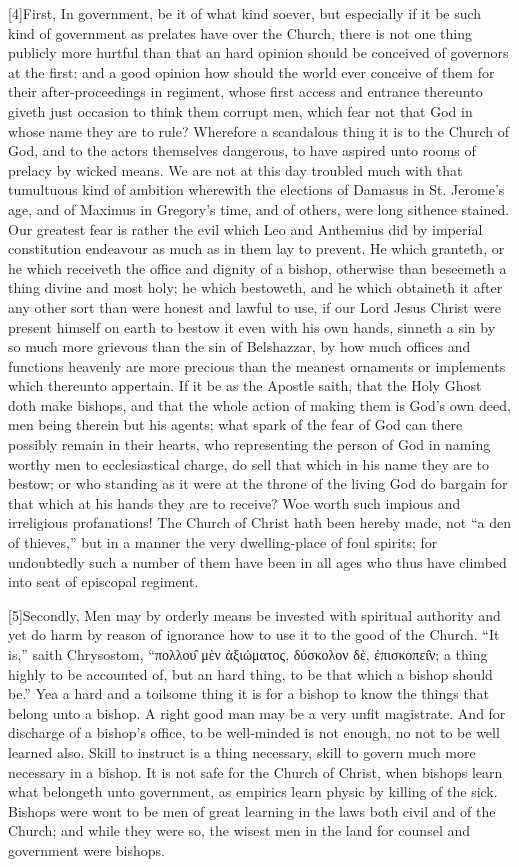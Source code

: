 [4]First, In government, be it of what kind soever, but especially if it be such kind of government as prelates have over the Church, there is not one thing publicly more hurtful than that an hard opinion should be conceived of governors at the first: and a good opinion how should the world ever conceive of them for their after-proceedings in regiment, whose first access and entrance thereunto giveth just occasion to think them corrupt men, which fear not that God in whose name they are to rule? Wherefore a scandalous thing it is to the Church of God, and to the actors themselves dangerous, to have aspired unto rooms of prelacy by wicked means. We are not at this day troubled much with that tumultuous kind  of ambition wherewith the elections of Damasus in St. Jerome’s age, and of Maximus in Gregory’s time, and of others, were long sithence stained. Our greatest fear is rather the evil which Leo and Anthemius did by imperial constitution endeavour as much as in them lay to prevent. He which granteth, or he which receiveth the office and dignity of a bishop, otherwise than beseemeth a thing divine and most holy; he which bestoweth, and he which obtaineth it after any other sort than were honest and lawful to use, if our Lord Jesus Christ were present himself on earth to bestow it even with his own hands, sinneth a sin by so much more grievous than the sin of Belshazzar, by how much offices and functions heavenly are more precious than the meanest ornaments or implements which thereunto appertain. If it be as the Apostle saith, that the Holy Ghost doth make bishops, and that the whole action of making them is God’s own deed, men being therein but his agents; what spark of the fear of God can there possibly remain in their hearts, who representing the person of God in naming worthy men to ecclesiastical charge, do sell that which in his name they are to bestow; or who standing as it were at the throne of the living God do bargain for that which at his hands they are to receive? Woe worth such impious and irreligious profanations! The Church of Christ hath been hereby made, not “a den of thieves,” but in a manner the very dwelling-place of foul spirits; for undoubtedly such a  number of them have been in all ages who thus have climbed into seat of episcopal regiment.

[5]Secondly, Men may by orderly means be invested with spiritual authority and yet do harm by reason of ignorance how to use it to the good of the Church. “It is,” saith Chrysostom, “πολλου̑ μὲν ἀξιώματος, δύσκολον δὲ, ἐπισκοπει̑ν; a thing highly to be accounted of, but an hard thing, to be that which a bishop should be.” Yea a hard and a toilsome thing it is for a bishop to know the things that belong unto a bishop. A right good man may be a very unfit magistrate. And for discharge of a bishop’s office, to be well-minded is not enough, no not to be well learned also. Skill to instruct is a thing necessary, skill to govern much more necessary in a bishop. It is not safe for the Church of Christ, when bishops learn what belongeth unto government, as empirics learn physic by killing of the sick. Bishops were wont to be men of great learning in the laws both civil and of the Church; and while they were so, the wisest men in the land for counsel and government were bishops.

